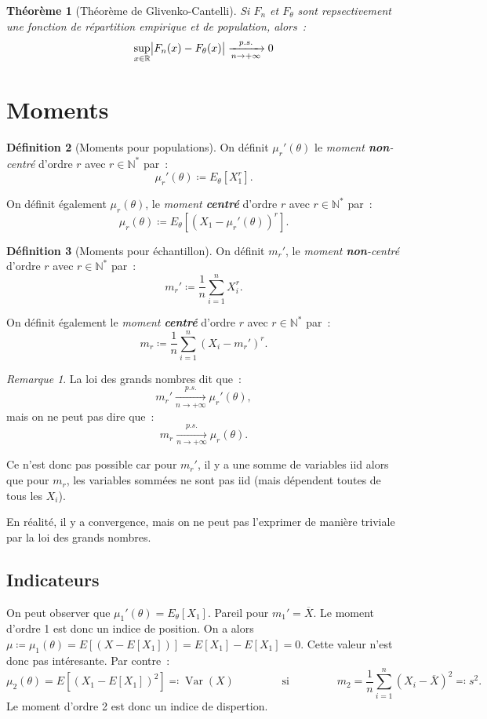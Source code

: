 \documentclass{report}
\DeclareMathOperator{\Var}{Var}
\newcommand{\pinfty}{{+\infty}}
\newcommand{\N}{\mathbb N}
\newcommand{\Ns}{\N^{*}}
\newcommand{\R}{\mathbb R}
\newtheorem{thm}{Théorème}[chapter]
\theoremstyle{definition}
\newtheorem{déf}[thm]{Définition}
\theoremstyle{remark}
\newtheorem*{rmq}{Remarque}
\begin{document}
		\begin{thm}[Théorème de Glivenko-Cantelli] Si $F_n$ et $F_\theta$ sont repsectivement une fonction de répartition empirique et de population, alors~:
		\[\sup_{x \in \R}\abs {F_n(x) - F_\theta(x)} \xrightarrow[n \to \pinfty]{p.s.} 0\]
		\end{thm}
	
	\section{Moments}
		\begin{déf}[Moments pour populations] On définit $\mu_r'(\theta)$ le \textit{moment \textbf{non}-centré} d'ordre $r$ avec $r \in \Ns$ par~:
		\[\mu_r'(\theta) \coloneqq E_\theta[X_1^r].\]

		On définit également $\mu_r(\theta)$, le \textit{moment \textbf{centré}} d'ordre $r$ avec $r \in \Ns$ par~:
		\[\mu_r(\theta) \coloneqq E_\theta\left[\left(X_1 - \mu_r'(\theta)\right)^r\right].\]
		\end{déf}

		\begin{déf}[Moments pour échantillon] On définit $m_r'$, le \textit{moment \textbf{non}-centré} d'ordre $r$ avec $r \in \Ns$ par~:
		\[m_r' \coloneqq \frac 1n\sum_{i=1}^n X_i^r.\]

		On définit également le \textit{moment \textbf{centré}} d'ordre $r$ avec $r \in \Ns$ par~:
		\[m_r \coloneqq \frac 1n\sum_{i=1}^n\left(X_i - m_r'\right)^r.\]
		\end{déf}

		\begin{rmq} La loi des grands nombres dit que~:
		\[m_r' \xrightarrow[n \to \pinfty]{p.s.} \mu_r'(\theta),\]
		mais on ne peut pas dire que~:
		\[m_r \xrightarrow[n \to \pinfty]{p.s.} \mu_r(\theta).\]

		Ce n'est donc pas possible car pour $m_r'$, il y a une somme de variables iid alors que pour $m_r$, les variables sommées ne sont pas iid (mais
		dépendent toutes de tous les $X_i$).
		
		En réalité, il y a convergence, mais on ne peut pas l'exprimer de manière triviale par la loi des grands nombres. \end{rmq}

		\subsection{Indicateurs}
			On peut observer que $\mu_1'(\theta) = E_\theta[X_1]$. Pareil pour $m_1' = \overline X$. Le moment d'ordre 1 est donc un indice de position.
			On a alors $\mu \coloneqq \mu_1(\theta) = E[(X - E[X_1])] = E[X_1] - E[X_1] = 0$. Cette valeur n'est donc pas intéresante. Par contre~:
			\[\mu_2(\theta) = E\left[(X_1 - E[X_1])^2\right] \eqqcolon \Var(X) \qquad\qquad \text{ si }
				\qquad\qquad m_2 = \frac 1n\sum_{i=1}^n\left(X_i - \overline X\right)^2 \eqqcolon s^2.\]
			Le moment d'ordre 2 est donc un indice de dispertion.
\end{document}
